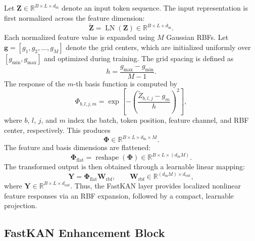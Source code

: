 \documentclass{ieeeaccess}
\begin{document}
Let $\mathbf{Z}\in\mathbb{R}^{B\times L\times d_{\mathrm{in}}}$ denote an input token sequence. The input representation is first normalized across the feature dimension:
\begin{equation}
\widetilde{\mathbf{Z}}
=
\operatorname{LN}(\mathbf{Z})
\in
\mathbb{R}^{B\times L\times d_{\mathrm{in}}}.
\label{eq:fastkan_norm}
\end{equation}
Each normalized feature value is expanded using $M$ Gaussian RBFs. Let
$\mathbf{g}=[g_1,g_2,\ldots,g_M]$ denote the grid centers, which are initialized uniformly over $[g_{\min},g_{\max}]$ and optimized during training. The grid spacing is defined as
\begin{equation}
h =
\frac{g_{\max}-g_{\min}}{M-1}.
\end{equation}
The response of the $m$-th basis function is computed by
\begin{equation}
\Phi_{b,l,j,m}
=
\exp
\left[
-
\left(
\frac{\widetilde{Z}_{b,l,j}-g_m}{h}
\right)^2
\right],
\label{eq:fastkan_rbf}
\end{equation}
where $b$, $l$, $j$, and $m$ index the batch, token position, feature channel, and RBF center, respectively. This produces
\begin{equation}
\boldsymbol{\Phi}
\in
\mathbb{R}^{B\times L\times d_{\mathrm{in}}\times M}.
\end{equation}
The feature and basis dimensions are flattened:
\begin{equation}
\boldsymbol{\Phi}_{\mathrm{flat}}
=
\operatorname{reshape}(\boldsymbol{\Phi})
\in
\mathbb{R}^{B\times L\times(d_{\mathrm{in}}M)}.
\end{equation}
The transformed output is then obtained through a learnable linear mapping:
\begin{equation}
\mathbf{Y}
=
\boldsymbol{\Phi}_{\mathrm{flat}}\mathbf{W}_{\mathrm{rbf}},
\qquad
\mathbf{W}_{\mathrm{rbf}}
\in
\mathbb{R}^{(d_{\mathrm{in}}M)\times d_{\mathrm{out}}},
\label{eq:fastkan_output}
\end{equation}
where $\mathbf{Y}\in\mathbb{R}^{B\times L\times d_{\mathrm{out}}}$. Thus, the FastKAN layer provides localized nonlinear feature responses via an RBF expansion, followed by a compact, learnable projection.

\subsection{FastKAN Enhancement Block}
\label{sec:feb}
\end{document}
